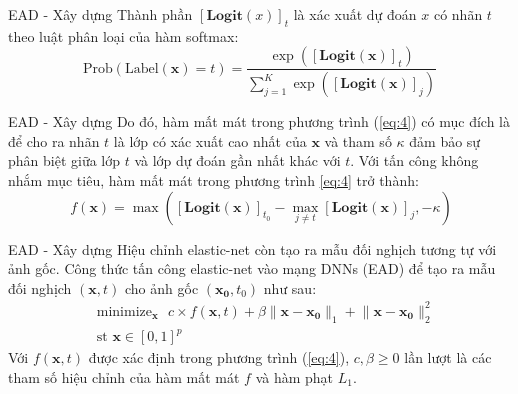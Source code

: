 \begin{frame}{EAD - Xây dựng}
    Thành phần $[\textbf{Logit}(x)]_t$ là xác xuất dự đoán $x$ có nhãn $t$ theo 
    luật phân loại của hàm softmax:
    \begin{equation}
        \label{eq:5}
        \text{Prob}(\text{Label}(\mathbf{x}) = t) = \frac{\exp([\textbf{Logit}(\mathbf{x})]_t)}{
            \sum_{j=1}^{K} \exp([\textbf{Logit}(\mathbf{x})]_j)
        }
    \end{equation}
\end{frame}

\begin{frame}{EAD - Xây dựng}
    Do đó, hàm mất mát trong phương trình (\ref{eq:4}) có mục đích là để cho ra nhãn $t$ là 
    lớp có xác xuất cao nhất của $\mathbf{x}$ và tham số $\kappa$ đảm bảo sự phân biệt giữa lớp $t$
    và lớp dự đoán gần nhất khác với $t$. Với tấn công không nhắm mục tiêu, hàm mất mát trong 
    phương trình \ref{eq:4} trở thành:
    \begin{equation}
        \label{eq:6}\
        f(\mathbf{x}) = \max { \left([\textbf{Logit}(\mathbf{x})]_{t_0} - 
        \max_{j \neq t} [\textbf{Logit}(\mathbf{x})]_j, -\kappa \right) }
    \end{equation}
\end{frame}

\begin{frame}{EAD - Xây dựng}
    Hiệu chỉnh 
    elastic-net còn tạo ra mẫu đối nghịch tương tự với ảnh gốc. Công thức tấn công elastic-net
    vào mạng DNNs (EAD) để tạo ra mẫu đối nghịch $(\mathbf{x},t)$ cho ảnh gốc $(\mathbf{x_0}, t_0)$ như sau:
    \begin{equation}
        \label{eq:7}
        \begin{split}
        &\text{minimize}_{\mathbf{x}} \text{ }
        c \times f(\mathbf{x}, t) + \beta \lVert \mathbf{x} - \mathbf{x_0} \rVert_1
        + \lVert \mathbf{x} - \mathbf{x_0} \rVert_2^2 \\
        &\text{st   } \mathbf{x} \in [0,1]^p
        \end{split}
    \end{equation}
    Với $f(\mathbf{x},t)$ được xác định trong phương trình (\ref{eq:4}), $c, \beta \geq 0$ lần lượt 
    là các tham số  hiệu chỉnh của hàm mất mát $f$ và hàm phạt $L_1$.
\end{frame}


